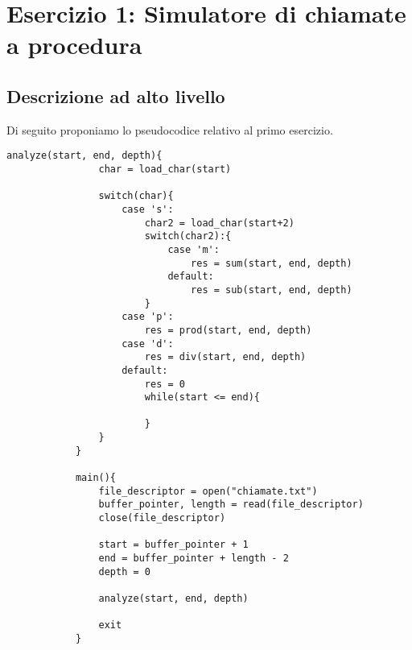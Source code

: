 \section*{Esercizio 1: Simulatore di chiamate a procedura}

	\subsection*{Descrizione ad alto livello}
	
		Di seguito proponiamo lo pseudocodice relativo al primo esercizio.
		
        \begin{center}
           	\begin{lstlisting}[language=pseudo, gobble=18]
           	analyze(start, end, depth){
	           	char = load_char(start)
	           	
	           	switch(char){
		           	case 's':
			           	char2 = load_char(start+2)
			           	switch(char2):{
				           	case 'm':
					           	res = sum(start, end, depth)
					        default:
						        res = sub(start, end, depth)
						}
                    case 'p':
                        res = prod(start, end, depth)
                    case 'd':
                        res = div(start, end, depth)
                    default:
                        res = 0
                        while(start <= end){
                            
                        }
	           	}
           	}
           	
           	main(){
	           	file_descriptor = open("chiamate.txt")
	           	buffer_pointer, length = read(file_descriptor)
	           	close(file_descriptor)
	           	
	           	start = buffer_pointer + 1
	           	end = buffer_pointer + length - 2
	           	depth = 0
	           	
	           	analyze(start, end, depth)
	           	
	           	exit
           	}
           	\end{lstlisting}
        \end{center}
		
		
